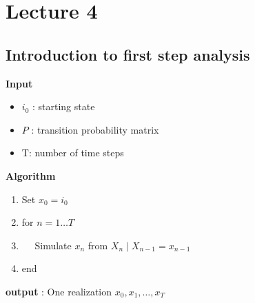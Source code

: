 \documentclass{article}
\theoremstyle{remark}
\begin{document}
\newpage

\section{Lecture 4}%
\label{sec:lecture_4}

 \subsection{Introduction to first step analysis}%
 \label{sub:introduction_to_first_step_analysis}

 \textbf{Input}
 \begin{itemize}
   \item $i_{0}$ : starting state
    \item $P$ : transition probability matrix
    \item T: number of time steps
 \end{itemize}
 \textbf{Algorithm}
 \begin{enumerate}
   \item Set $x_{0} = i_{0}$
   \item for $n=1 \ldots T$
   \item $\quad   $ Simulate $x_{n}$ from $X_{n}  \mid  X_{n-1} = x_{n-1}$
   \item end
 \end{enumerate}

 \textbf{output} : One realization $x_{0}, x_{1} , \ldots, x_{T}$
\end{document}
